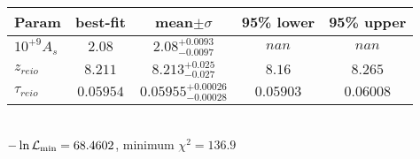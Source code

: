 \begin{tabular}{|l|c|c|c|c|} 
 \hline 
Param & best-fit & mean$\pm\sigma$ & 95\% lower & 95\% upper \\ \hline 
$10^{+9}A_{s }$ &$2.08$ & $2.08_{-0.0097}^{+0.0093}$ & $nan$ & $nan$ \\ 
$z_{reio }$ &$8.211$ & $8.213_{-0.027}^{+0.025}$ & $8.16$ & $8.265$ \\ 
$\tau{}_{reio }$ &$0.05954$ & $0.05955_{-0.00028}^{+0.00026}$ & $0.05903$ & $0.06008$ \\ 
\hline 
 \end{tabular} \\ 
$-\ln{\cal L}_\mathrm{min} =68.4602$, minimum $\chi^2=136.9$ \\ 
